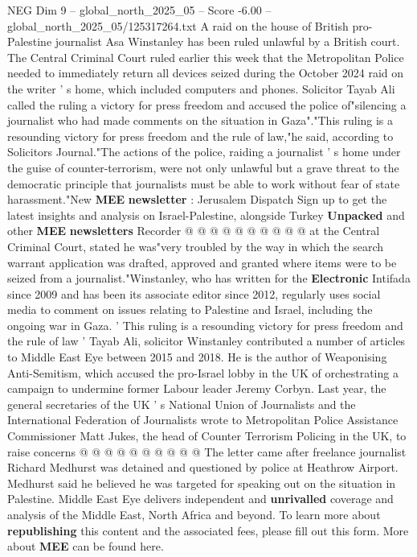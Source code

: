 \begin{textsample}{NEG Dim 9 – global\_north\_2025\_05 – Score -6.00 – global\_north\_2025\_05/125317264.txt}  \label{ex:f9_neg_092}
A raid on the house of British pro-Palestine journalist Asa Winstanley has been ruled unlawful by a British court.
The Central Criminal Court ruled earlier this week that the Metropolitan Police needed to immediately return all devices seized during the October 2024 raid on the writer ' s home, which included computers and phones.
Solicitor Tayab Ali called the ruling a victory for press freedom and accused the police of"silencing a journalist who had made comments on the situation in Gaza"."This ruling is a resounding victory for press freedom and the rule of law,"he said, according to Solicitors Journal."The actions of the police, raiding a journalist ' s home under the guise of counter-terrorism, were not only unlawful but a grave threat to the democratic principle that journalists must be able to work without fear of state harassment."New \textbf{MEE} \textbf{newsletter} : Jerusalem Dispatch Sign up to get the latest insights and analysis on Israel-Palestine, alongside Turkey \textbf{Unpacked} and other \textbf{MEE} \textbf{newsletters} Recorder @ @ @ @ @ @ @ @ @ @ at the Central Criminal Court, stated he was"very troubled by the way in which the search warrant application was drafted, approved and granted where items were to be seized from a journalist."Winstanley, who has written for the \textbf{Electronic} Intifada since 2009 and has been its associate editor since 2012, regularly uses social media to comment on issues relating to Palestine and Israel, including the ongoing war in Gaza. ' This ruling is a resounding victory for press freedom and the rule of law ' Tayab Ali, solicitor Winstanley contributed a number of articles to Middle East Eye between 2015 and 2018.
He is the author of Weaponising Anti-Semitism, which accused the pro-Israel lobby in the UK of orchestrating a campaign to undermine former Labour leader Jeremy Corbyn.
Last year, the general secretaries of the UK ' s National Union of Journalists and the International Federation of Journalists wrote to Metropolitan Police Assistance Commissioner Matt Jukes, the head of Counter Terrorism Policing in the UK, to raise concerns @ @ @ @ @ @ @ @ @ @ The letter came after freelance journalist Richard Medhurst was detained and questioned by police at Heathrow Airport.
Medhurst said he believed he was targeted for speaking out on the situation in Palestine.
Middle East Eye delivers independent and \textbf{unrivalled} coverage and analysis of the Middle East, North Africa and beyond.
To learn more about \textbf{republishing} this content and the associated fees, please fill out this form.
More about \textbf{MEE} can be found here.

\end{textsample}
